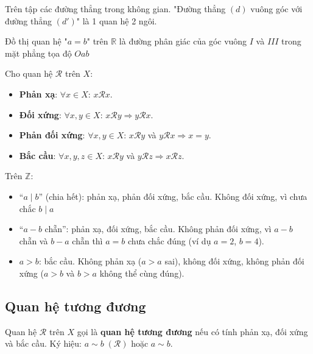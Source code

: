 \documentclass[12pt,a4paper]{article}
\begin{document}
\begin{vidu}
  Trên tập các đường thẳng trong không gian. "Đường thẳng $(d)$ vuông góc với đường thẳng $(d')$" là 1 quan hệ 2 ngôi.

  Đồ thị quan hệ "$a = b$" trên $\mathbb{R}$ là đường phân giác của góc vuông $I$ và $III$ trong mặt phẳng tọa độ $Oab$
\end{vidu}

\begin{dinhnghia}[title={Các tính chất}]
  Cho quan hệ $\mathcal{R}$ trên $X$:
  \begin{itemize}
    \item \textbf{Phản xạ}: $\forall x \in X$: $x \mathcal{R} x$.
    \item \textbf{Đối xứng}: $\forall x, y \in X$: $x \mathcal{R} y \Rightarrow y \mathcal{R} x$.
    \item \textbf{Phản đối xứng}: $\forall x, y \in X$: $x \mathcal{R} y$ và $y \mathcal{R} x \Rightarrow x = y$.
    \item \textbf{Bắc cầu}: $\forall x, y, z \in X$: $x \mathcal{R} y$ và $y \mathcal{R} z \Rightarrow x \mathcal{R} z$.
  \end{itemize}
\end{dinhnghia}

\begin{vidu}
  Trên $\mathbb{Z}$: 
  \begin{itemize}
  \item ``$a \mid b$'' (chia hết): phản xạ, phản đối xứng, bắc cầu. Không đối xứng, vì chưa chắc $b \mid a$
  \item ``$a - b$ chẵn'': phản xạ, đối xứng, bắc cầu. Không phản đối xứng, vì $a - b$ chẵn và $b - a$ chẵn thì $a = b$ chưa chắc đúng (ví dụ $a = 2$, $b = 4$).
  \item $a > b$: bắc cầu. Không phản xạ ($a > a$ sai), không đối xứng, không phản đối xứng ($a > b$ và $b > a$ không thể cùng đúng).
  \end{itemize}
\end{vidu}

\subsection{Quan hệ tương đương}

\begin{dinhnghia}
  Quan hệ $\mathcal{R}$ trên $X$ gọi là \textbf{quan hệ tương đương} nếu có tính phản xạ, đối xứng và bắc cầu. Ký hiệu: $a \sim b \;(\mathcal{R})$ hoặc $a \sim b$.
\end{dinhnghia}
\end{document}
